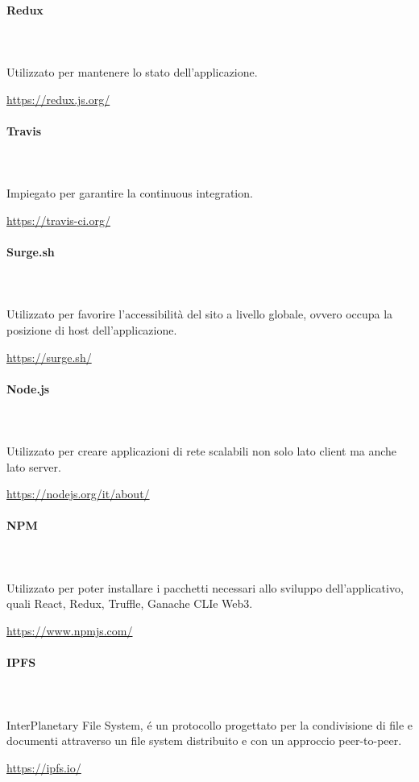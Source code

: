 \begin{itemize}
		\paragraph{Redux} \mbox{}\\ \mbox{}\\
		Utilizzato per mantenere lo stato dell'applicazione.\\
		\centerline{\url{https://redux.js.org/}}
		
		\paragraph{Travis} \mbox{}\\ \mbox{}\\
		Impiegato per garantire la continuous integration.\\
		\centerline{\url{https://travis-ci.org/}}
		
		\paragraph{Surge.sh} \mbox{}\\ \mbox{}\\
		Utilizzato per favorire l'accessibilità del sito a livello globale, ovvero occupa la posizione di host dell'applicazione.\\
		\centerline{\url{https://surge.sh/}}
		
		\paragraph{Node.js} \mbox{}\\ \mbox{}\\
		Utilizzato per creare applicazioni di rete scalabili non solo lato client ma anche lato server.\\
		\centerline{\url{https://nodejs.org/it/about/}}
		
		\paragraph{NPM} \mbox{}\\ \mbox{}\\
		Utilizzato per poter installare i pacchetti necessari allo sviluppo dell'applicativo, quali React\glo, Redux\glo, Truffle\glo, Ganache CLI\glosp e Web3\glo. \\
		\centerline{\url{https://www.npmjs.com/}}
		
		\paragraph{IPFS} \mbox{}\\ \mbox{}\\
		InterPlanetary File System, \'e un protocollo progettato per la condivisione di file e documenti attraverso un file system 
		distribuito e con un approccio peer-to-peer. \\
		\centerline{\url{https://ipfs.io/}}
		

\end{itemize}
